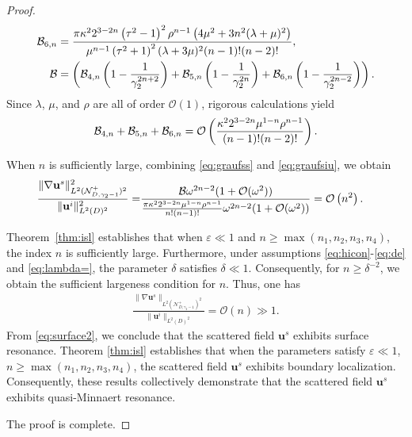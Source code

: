\documentclass[11pt,reqno,twoside]{amsart}
\theoremstyle{definition}
\theoremstyle{remark}
\numberwithin{equation}{section}
\newcommand{\bu}{\mathbf{u}}
\begin{document}
\begin{proof}
\begin{align}
					\mathcal{B}_{6,n}&=\frac{ \pi\kappa^2 2^{3-2 n} \left(\tau ^2-1\right)^2 \rho ^{n-1}\left(4 \mu ^2+3 n^2 (\lambda +\mu )^2\right) }{\mu ^{n-1} \left(\tau ^2+1\right)^2 (\lambda +3 \mu )^2  (n-1)!(n-2)!},\notag\\
					\mathcal{B}&=\left(\mathcal{B}_{4,n}\left(1-\frac{1}{\gamma _{2}^{2n+2}}\right)+\mathcal{B}_{5,n}\left(1-\frac{1}{\gamma _{2}^{2n}}\right)+\mathcal{B}_{6,n}\left(1-\frac{1}{\gamma _{2}^{2n-2}}\right)\right).\notag   
				\end{align}
				Since $\lambda$, $\mu$, and $\rho$ are all of order $\mathcal{O}(1)$, rigorous calculations yield
				\begin{align}\notag
					\mathcal{B}_{4,n}+\mathcal{B}_{5,n}+\mathcal{B}_{6,n}=\mathcal{O}\left(\frac{  \kappa^2 2^{3-2 n}  \mu ^{1-n} \rho ^{n-1}  }{  (n-1)! (n-2)!}\right).\notag
				\end{align}
				
				When $n$ is sufficiently large, combining \eqref{eq:graufss} and \eqref{eq:graufsiu}, we obtain
				\begin{align}
					\frac{\|\nabla\bu^s\|_{L^2(\mathcal{N}_{D,\gamma_{2}-1}^{+})^2}^2}{\|\bu^i\|_{L^2(D)^2}^2}=&\frac{\mathcal{B}\omega ^{2n-2}(1+\mathcal{O}(\omega^2  ))}{\frac{\pi\kappa ^2 2^{3-2 n} \mu ^{1-n} \rho ^{n-1} }{n!(n-1)!} \omega^{2n-2}(1+\mathcal{O}(\omega^2  ))} =\mathcal{O}\left(n^2\right).\notag
				\end{align}
				
				Theorem~\ref{thm:isl} establishes that when $\varepsilon \ll 1$ and $n \geq \max(n_1, n_2, n_3, n_4)$, the index $n$ is sufficiently large. Furthermore, under assumptions \eqref{eq:hicon}-\eqref{eq:de} and \eqref{eq:lambda=}, the  parameter $\delta$ satisfies $\delta \ll 1$. Consequently, for  $n \geq \delta^{-2}$, we obtain the sufficient largeness condition for $n$. Thus, one has
				\begin{align}\label{eq:surface2} 
					\frac{\|\nabla\bu^s\|_{L^2(\mathcal{N}_{D,\gamma_{2}-1}^{+})^2}}{\|\bu^i\|_{L^2(D)^2}}=\mathcal{O}\left({n}\right)\gg1.  
				\end{align}   
				From \eqref{eq:surface2}, we conclude that the scattered field \(\mathbf{u}^s\) exhibits surface resonance.  Theorem \ref{thm:isl} establishes that when the parameters satisfy \(\varepsilon \ll 1\), \(n \geq \max\left(n_1, n_2, n_3, n_4\right)\), the scattered field \(\mathbf{u}^s\) exhibits boundary localization. Consequently, these results collectively demonstrate that the scattered field \(\mathbf{u}^s\) exhibits quasi-Minnaert resonance.
				
				The proof is complete.
			\end{proof}
			
\end{document}
